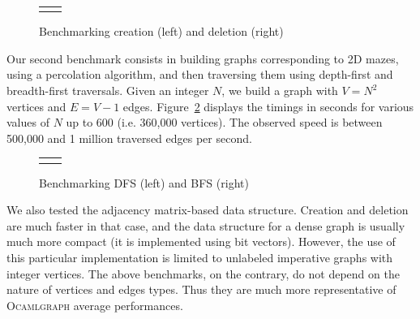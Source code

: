 \documentclass[tfpsymp]{tfp05symp}
\newcommand{\ocamlgraph}{\textsc{Ocamlgraph}\xspace}
\begin{document}
\begin{figure}
  \centering\hspace*{-2em}
  \begin{tabular}{cc}
  \begin{minipage}{0.5\linewidth}
    
  \end{minipage} &
  \begin{minipage}{0.5\linewidth}
  
  \end{minipage}
  \end{tabular}
  \caption{Benchmarking creation (left) and deletion (right)}
  \label{fig:bench:build}
\end{figure}

Our second benchmark consists in building graphs corresponding to 2D
mazes, using a percolation algorithm, and then traversing them using
depth-first and breadth-first traversals. Given an integer $N$, we
build a graph with $V=N^2$ vertices and $E=V-1$
edges. Figure~\ref{fig:bench:maze} displays the timings in seconds for various
values of $N$ up to 600 (i.e. 360,000 vertices). The observed speed is
between 500,000 and 1 million traversed edges per second.

% 

\begin{figure}
  \centering\hspace*{-2em}
  \begin{tabular}{cc}
  \begin{minipage}{0.5\linewidth}

  \end{minipage} &
  \begin{minipage}{0.5\linewidth}

  \end{minipage}
  \end{tabular}
  \caption{Benchmarking DFS (left) and BFS (right)}
  \label{fig:bench:maze}
\end{figure}

% 

We also tested the adjacency matrix-based data structure. Creation and
deletion are much faster in that case, and the data structure for
a dense graph is usually much more compact (it is implemented using bit
vectors). However, the use of this particular implementation is
limited to unlabeled imperative graphs with integer vertices. 
The above benchmarks, on the contrary, do not depend on the nature of
vertices and edges types. Thus they are much more representative of
\ocamlgraph average performances.
\end{document}
